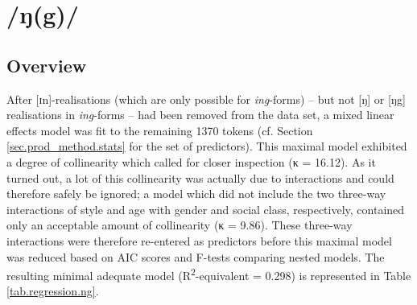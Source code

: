 \section{/ŋ(g)/}
\label{prod.res.con.ng}

\subsection{Overview}
\label{sec.prod.res.con.ng.overview}

After [ɪn]-realisations (which are only possible for \emph{ing}-forms) – but not [ŋ] or [ŋg] realisations in \emph{ing}-forms – had been removed from the data set, a mixed linear effects model was fit to the remaining 1370 tokens (cf. Section \ref{sec.prod_method.stats} for the set of predictors).
This maximal model exhibited a degree of collinearity which called for closer inspection (κ = 16.12).
As it turned out, a lot of this collinearity was actually due to interactions and could therefore safely be ignored; a model which did not include the two three-way interactions of style and age with gender and social class, respectively, contained only an acceptable amount of collinearity (κ = 9.86).
These three-way interactions were therefore re-entered as predictors before this maximal model was reduced based on AIC scores and F-tests comparing nested models.
The resulting minimal adequate model (R\textsuperscript{2}-equivalent = 0.298) is represented in Table \ref{tab.regression.ng}.

